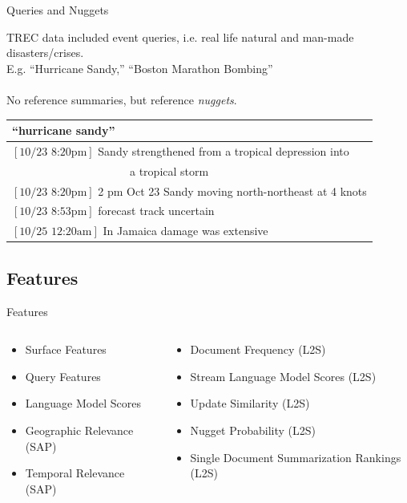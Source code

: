 \begin{frame}{Queries and Nuggets}

    TREC data included event queries, i.e. real life natural and man-made
    disasters/crises.\\
    E.g. ``Hurricane Sandy,'' ``Boston Marathon Bombing''\\
~\\
No reference summaries, but reference \textit{nuggets}.
        \begin{tabular}{l}
         \textbf{``hurricane sandy''} \\
        \hline
    $[\textrm{10/23 8:20pm}]$ Sandy strengthened from a tropical depression into\\
    ~~~~~~~~~~~~~~~~~~~~~a tropical storm \\
    $[\textrm{10/23 8:20pm}]$ 2 pm Oct 23 Sandy moving north-northeast at 4 
    knots \\
    $[\textrm{10/23 8:53pm}]$ forecast track uncertain \\
    $[\textrm{10/25 12:20am}]$ In Jamaica damage was extensive\\
\end{tabular}


\end{frame}


\subsection{Features}
\begin{frame}{Features}
  \begin{columns}
      \begin{column}{.5\textwidth}
      \begin{itemize}
        \item Surface Features
        \item Query Features
        \item Language Model Scores
        \item Geographic Relevance (SAP)
        \item Temporal Relevance (SAP)
      \end{itemize}
    \end{column}
    \begin{column}{.5\textwidth}
      \begin{itemize}
        \item Document Frequency (L2S)
        \item Stream Language Model Scores (L2S)
        \item Update Similarity (L2S)
        \item Nugget Probability (L2S)
        \item Single Document Summarization Rankings (L2S)
      \end{itemize}
   \end{column}
  \end{columns}
\end{frame}

